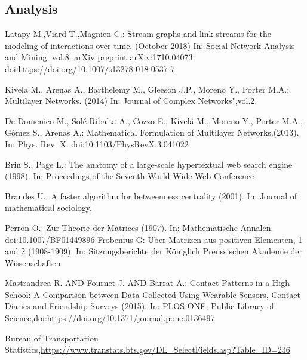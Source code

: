 \documentclass{svproc}
\begin{document}
\subsection{Analysis}
%
\newpage
%
\begin{thebibliography}{6}
%


Latapy M.,Viard T.,Magnien C.: Stream graphs and link streams for the modeling
of interactions over time. (October 2018) In: Social Network Analysis and Mining, vol.8. arXiv preprint arXiv:1710.04073. \url{doi:https://doi.org/10.1007/s13278-018-0537-7}

Kivela M., Arenas A., Barthelemy M., Gleeson J.P., Moreno Y., Porter M.A.: Multilayer Networks. (2014) In: Journal of Complex Networks",vol.2.

De Domenico M., Sol\'e-Ribalta A., Cozzo E., Kivel\"a M., Moreno Y., Porter M.A., G\'omez S., Arenas A.: Mathematical Formulation of Multilayer Networks.(2013). In: Phys. Rev. X. doi:10.1103/PhysRevX.3.041022

Brin S., Page L.: The anatomy of a large-scale hypertextual web search engine (1998). In: Proceedings of the Seventh World Wide Web Conference

Brandes U.: A faster algorithm for betweenness centrality (2001). In: Journal of mathematical sociology.

Perron O.: Zur Theorie der Matrices (1907). In: Mathematische Annalen. \url{doi:10.1007/BF01449896}
Frobenius G: Über Matrizen aus positiven Elementen, 1 and 2 (1908-1909). In: Sitzungsberichte der Königlich Preussischen Akademie der Wissenschaften.

Mastrandrea R. AND Fournet J. AND Barrat A.: Contact Patterns in a High School: A Comparison between Data Collected Using Wearable Sensors, Contact Diaries and Friendship Surveys (2015). In: PLOS ONE, Public Library of Science,\url{doi:https://doi.org/10.1371/journal.pone.0136497}

Bureau of Transportation Statistics,\url{https://www.transtats.bts.gov/DL_SelectFields.asp?Table_ID=236}




\end{thebibliography}
\end{document}
